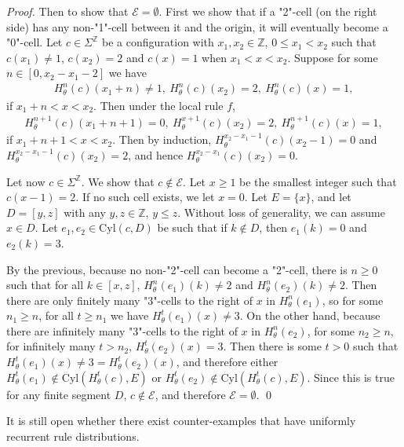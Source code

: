\documentclass[runningheads]{llncs}
\newcommand{\Z}{\mathbb{Z}}
\newcommand{\cyl}{\mathrm{Cyl}}
\begin{document}
\begin{proof}
Then to show that $\mathcal{E} = \emptyset$. First we show that if a "2"-cell (on the right side) has any non-"1"-cell between it and the origin, it will eventually become a "0"-cell. %
Let $c \in \Sigma^\Z$ be a configuration with  $x_1,x_2 \in \Z$, $0\leq x_1< x_2$ such that $c(x_1)\neq 1$, $c(x_2)=2$ and $c(x) = 1$ when $x_1 < x < x_2$. Suppose for some $n \in [0, x_2-x_1-2]$ we have 
\begin{align*}
H_\theta ^n (c)(x_1+n) \neq 1, \:
H_\theta ^n (c)(x_2) = 2, \:
H_\theta ^n (c)(x) = 1,
\end{align*}
if $x_1+n < x < x_2$. Then under the local rule $f$,
\begin{align*}
H_\theta ^{n+1} (c)(x_1+n+1) = 0,\:
H_\theta ^{x+1} (c)(x_2) = 2, \:
H_\theta ^{n+1} (c)(x) = 1,
\end{align*}
if $x_1+n+1 < x < x_2$. Then by induction, $H_\theta ^{x_2-x_1-1}(c)(x_2-1)=0$ and $H_\theta ^{x_2-x_1-1}(c)(x_2)=2$, and hence $H_\theta ^{x_2-x_1}(c)(x_2)=0$.

Let now $c \in \Sigma^\Z$. We show that $c \notin \mathcal{E}$. Let $x\geq 1$ be the smallest integer such that $c(x-1)=2$. If no such cell exists, we let $x=0$. Let $E=\{x\}$, and let $D=[y,z]$ with any $y,z \in \Z$, $y\leq z$. Without loss of generality, we can assume $x \in D$. Let $e_1,e_2 \in \cyl (c,D)$ be such that if $k \notin D$, then $e_1(k) = 0$ and $e_2(k) = 3$.

By the previous, because no non-"2"-cell can become a "2"-cell, there is $n\geq 0$ such that for all $k \in [x,z]$, $H_\theta ^n (e_1)(k) \neq 2$ and $H_\theta ^n (e_2)(k) \neq 2$. Then there are only finitely many "3"-cells to the right of $x$ in $H_\theta ^n (e_1)$, so for some $n_1 \geq n$, for all $t\geq n_1$ we have $H_\theta ^t (e_1)(x) \neq 3$. On the other hand, because there are infinitely many "3"-cells to the right of $x$ in $H_\theta ^n (e_2)$, for some $n_2 \geq n$, for infinitely many $t > n_2$, $H_\theta ^t (e_2)(x) = 3$. Then there is some $t>0$ such that $H_\theta ^t (e_1)(x) \neq 3 = H_\theta ^t (e_2)(x)$, and therefore either $H_\theta ^t (e_1) \notin \cyl (H_\theta ^t (c),E)$ or $H_\theta ^t (e_2) \notin \cyl (H_\theta ^t (c),E)$. Since this is true for any finite segment $D$, $c \notin \mathcal{E}$, and therefore $\mathcal{E} = \emptyset$.
\qed
\end{proof}


It is still open whether there exist counter-examples that have uniformly recurrent rule distributions.
\end{document}
